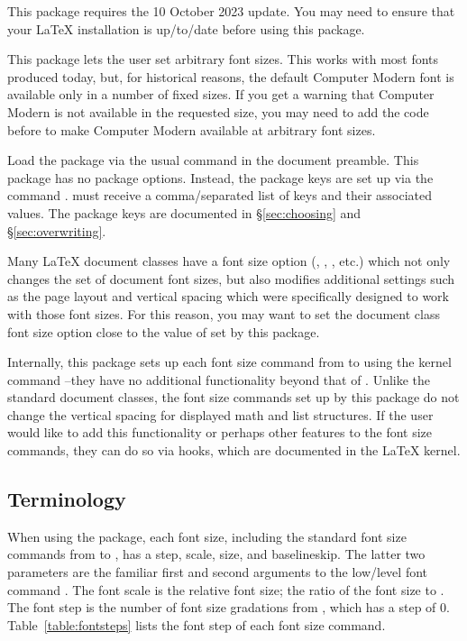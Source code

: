 \documentclass{beery}
\begin{document}
This package requires the 10 October 2023  update.
You may need to ensure that your \LaTeX{} installation is up\-/to\-/date before using this package.

This package lets the user set arbitrary font sizes.
This works with most fonts produced today, but, for historical reasons, the default Computer Modern font is available only in a number of fixed sizes.
If you get a warning that Computer Modern is not available in the requested size, you may need to add the code  before  to make Computer Modern available at arbitrary font sizes.

\nopagebreak\newline
{}

Load the  package via the usual command in the document preamble.
This package has no package options.
Instead, the package keys are set up via the command .
 must receive a comma\-/separated list of keys and their associated values.
The package keys are documented in \S\ref{sec:choosing} and \S\ref{sec:overwriting}.

Many \LaTeX{} document classes have a font size option (\Key{10pt}, \Key{11pt}, \Key{12pt}, etc.\@) which not only changes the set of document font sizes, but also modifies additional settings such as the page layout and vertical spacing which were specifically designed to work with those font sizes.
For this reason, you may want to set the document class font size option close to the value of  set by this package.

Internally, this package sets up each font size command from  to  using the kernel command \---they have no additional functionality beyond that of .
Unlike the standard document classes, the font size commands set up by this package do not change the vertical spacing for displayed math and list structures.
If the user would like to add this functionality or perhaps other features to the font size commands, they can do so via hooks, which are documented in the \LaTeX{} kernel.

\subsection{Terminology}
\label{subsec:terminology}

When using the  package, each font size, including the standard font size commands from  to , has a step, scale, size, and baselineskip.
The latter two parameters are the familiar first and second arguments to the low\-/level font command .
The font scale is the relative font size; the ratio of the font size to .
The font step is the number of font size gradations from , which has a step of \num{0}.
Table~\ref{table:fontsteps} lists the font step of each font size command.
\end{document}
